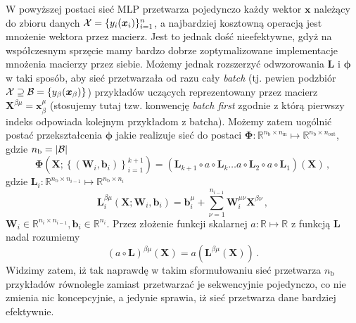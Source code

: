 \documentclass{myclass}
\numberwithin{equation}{subsection}
\begin{document}
W powyższej postaci sieć MLP przetwarza pojedynczo każdy wektor \(\bm{x}\) należący do zbioru danych
\(\mathcal{X} = \{y_i(\bm{x}_i)\}_{i=1}^n\), a najbardziej kosztowną operacją jest mnożenie wektora przez
macierz. Jest to jednak dość nieefektywne, gdyż na współczesnym sprzęcie mamy bardzo dobrze
zoptymalizowane implementacje mnożenia macierzy przez siebie. Możemy jednak rozszerzyć odwzorowania
\(\bm{L}\) i \(\bm{\phi}\) w taki sposób, aby sieć przetwarzała od razu cały \textit{batch} (tj.
pewien podzbiór \(\mathcal{X} \supseteq \mathcal{B} = \{y_\beta(\bm{x}_\beta)\}\)) przykładów uczących
reprezentowany przez macierz \(\bm{X}^{\beta \mu} = \bm{x}_\beta^\mu\) (stosujemy tutaj tzw.
konwencję \textit{batch first} zgodnie z którą pierwszy indeks odpowiada kolejnym przykładom z
batcha). Możemy zatem uogólnić postać przekształcenia \(\bm{\phi}\) jakie realizuje sieć do postaci
\(\bm{\Phi}: \mathbb{R}^{n_\text{b} \times n_\text{in}} \mapsto \mathbb{R}^{n_\text{b} \times
n_\text{out}}\), gdzie \(n_\text{b} = |\mathcal{B}|\)
\[
\bm{\Phi}\left(\bm{X}; \left\{(\bm{W}_i, \bm{b}_i)\right\}_{i=1}^{k+1}\right) = (\bm{L}_{k+1} \circ a \circ \bm{L}_k \ldots a \circ \bm{L}_2 \circ a \circ \bm{L}_1)(\bm{X})\,,
\]
gdzie \(\bm{L}_i: \mathbb{R}^{n_\text{b} \times n_{i-1}} \mapsto \mathbb{R}^{n_\text{b} \times n_i}\)
\[
\bm{L}_i^{\beta\mu}(\bm{X}; \bm{W}_i, \bm{b}_i) = \bm{b}_i^\mu + \sum_{\nu=1}^{n_{i-1}} \bm{W}_i^{\mu\nu} \bm{X}^{\beta\nu}\,,
\]
\(\bm{W}_i \in \mathbb{R}^{n_i \times n_{i-1}}, \bm{b}_i \in \mathbb{R}^{n_i}\). Przez złożenie
funkcji skalarnej \(a: \mathbb{R} \mapsto \mathbb{R}\) z funkcją \(\bm{L}\) nadal rozumiemy
\[
(a \circ \bm{L})^{\beta\mu}(\bm{X}) = a(\bm{L}^{\beta\mu}(\bm{X}))\,.
\]
Widzimy zatem, iż tak naprawdę w takim sformułowaniu sieć przetwarza \(n_\text{b}\) przykładów
równolegle zamiast przetwarzać je sekwencyjnie pojedynczo, co nie zmienia nic koncepcyjnie, a
jedynie sprawia, iż sieć przetwarza dane bardziej efektywnie.
\end{document}
